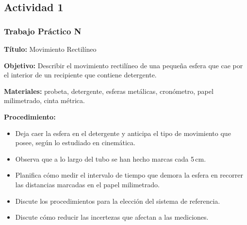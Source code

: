 \subsection*{Actividad 1}
\subsubsection{Trabajo Práctico N}


\textbf{Título:} Movimiento Rectilíneo

\textbf{Objetivo:} Describir el movimiento rectilíneo de una pequeña esfera que cae por el interior de un recipiente que contiene detergente.

\textbf{Materiales:} probeta, detergente, esferas metálicas, cronómetro,  papel milimetrado, cinta métrica.

\textbf{Procedimiento:}
\begin{itemize}
  \item Deja caer la esfera en el detergente y anticipa el tipo de movimiento que posee, según lo estudiado en cinemática.
  \item Observa que a lo largo del tubo se han hecho marcas cada 5\,cm.
  \item Planifica cómo medir el intervalo de tiempo que demora la esfera en recorrer las distancias marcadas en el papel milimetrado.
  \item Discute los procedimientos para la elección del sistema de referencia.
    \item Discute cómo reducir las incertezas que afectan a las mediciones.
\end{itemize}

